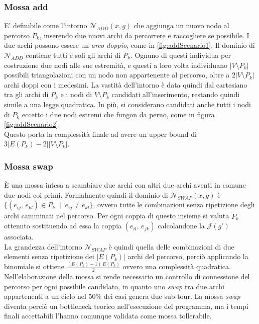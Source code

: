 \subsubsection{Mossa add} 
	E' definibile come l'intorno $\mathcal{N}_{ADD}(x,g)$ che aggiunga un nuovo nodo al percorso $P_k$, inserendo due nuovi archi da percorrere
	e raccogliere se possibile. I due archi possono essere un \emph{arco doppio}, come in \ref{fig:addScenario1}. 
	Il dominio di $\mathcal{N}_{ADD}$ contiene tutti e soli gli archi di $P_k$.
	Ognuno di questi individua per costruzione due nodi alle sue estremità, e questi a loro volta individuano $|V\setminus P_k|$ possibili triangolazioni con un nodo
	non appartenente al percorso, oltre a $2|V\setminus P_k|$ archi doppi con i medesimi. La vastità dell'intorno è data quindi dal
	 cartesiano tra gli archi di $P_k$ e
	i nodi di $V \setminus P_k$ candidati all'inserimento, restando quindi simile a una legge quadratica.
	In più, si considerano candidati anche tutti i nodi di $P_k$ eccetto i due nodi estremi che fungon da perno, come in figura \ref{fig:addScenario2}. \\
	Questo porta la complessità finale ad avere un upper bound di $3|E(P_k)-2||V\setminus P_k|$.
	

\subsubsection{Mossa swap} %
	È una mossa intesa a scambiare due archi con altri due archi aventi in comune due nodi coi primi. Formalmente quindi il
	dominio di $\mathcal{N}_{SWAP}(x,g)$ è $\{(e_{ij},\,e_{kl}) \in P_k\;\;|\;\; e_{ij} \neq e_{kl}\}$, ovvero tutte le combinazioni senza ripetizione degli
	archi camminati nel percorso. Per ogni coppia di questo insieme si valuta $\tilde P_k$ ottenuto sostituendo ad essa la coppia $(e_{il},\,e_{jk})$ calcolandone la $\mathcal{J}(g\prime)$
	associata. \\
	La grandezza dell'intorno $\mathcal{N}_{SWAP}$ è quindi quella delle combinazioni di due elementi senza ripetizione dei $|E(P_k)|$ archi del percorso, 
	perciò applicando la binomiale si ottiene $\frac{(E(P_k)-1)\,E(P_k)}{2}$ ovvero una complessità quadratica.
	Nell'elaborazione della mossa si rende necessario un controllo di connessione del percorso per ogni possibile candidato, in quanto uno \emph{swap} 
	tra due archi appartenenti a un ciclo nel $50\%$ dei casi genera due sub-tour. La mossa \emph{swap} diventa perciò un bottleneck teorico nell'esecuzione
	del programma, ma i tempi finali accettabili l'hanno comunque validata come mossa tollerabile.
	

